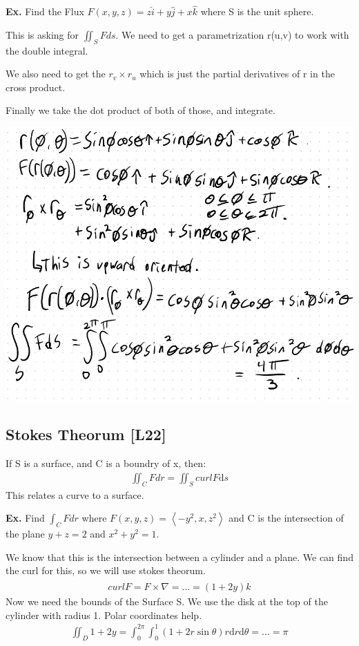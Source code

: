 \documentclass[12pt,letterpaper]{article} \usepackage{amsmath} \usepackage{graphicx} \usepackage[margin=1in]{geometry} \usepackage{longtable}  \usepackage{amssymb}
\begin{document}
	\begin{mdframed}[]
	\textbf{Ex.} Find the Flux $F(x,y,z) = z \hat{i} + y \hat j + x \hat k$ where S is the unit sphere.
	
	This is asking for $\iint_S Fds$. We need to get a parametrization r(u,v) to work with the double integral. 
	
	We also need to get the $r_v \times r_u$ which is just the partial derivatives of r in the cross product. 
	
	Finally we take the dot product of both of those, and integrate. 
	\begin{center}
		\includegraphics[width=0.7\linewidth]{ex4}
	\end{center}
	
	\end{mdframed}
	
	\subsection{Stokes Theorum [L22]}
	If S is a surface, and C is a boundry of x, then:
	\begin{align*}
		\iint_C Fdr = \iint_S curl F \mathrm{d}s
	\end{align*}
	This relates a curve to a surface.
	
	\begin{mdframed}[]
	\textbf{Ex. } Find $\int_C Fdr$ where $F(x,y,z) = \left<-y^2, x, z^2\right>$ and C is the intersection of the plane $y+z=2$ and $x^2+y^2=1$.
	
	We know that this is the intersection between a cylinder and a plane. We can find the curl for this, so we will use stokes theorum.
	\begin{align*}
		curl F = F\times \nabla = ... = (1+2y) \hat k
	\end{align*}
	Now we need the bounds of the Surface S. We use the disk at the top of the cylinder with radius 1. Polar coordinates help.
	\begin{align*}
		\iint_D 1+2y = \int_0^{2\pi} \int_0^1 (1+2r\sin\theta)r\mathrm{d}r\mathrm{d}\theta = ... = \pi
	\end{align*}

	\end{mdframed}
\end{document}
